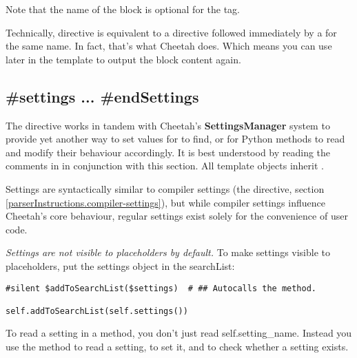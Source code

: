 Note that the name of the block is optional for the  tag.

Technically,  directive is equivalent to a  directive
followed immediately by a  for the same name.  In fact,
that's what Cheetah does.  Which means you can use 
later in the template to output the block content again.



\subsection{\#settings ... \#endSettings}
\label{inheritanceEtc.settings}

The  directive works in tandem with Cheetah's
{\bf SettingsManager} system to provide yet another way to set values for
 to find, or for Python methods to read and modify their
behaviour accordingly.  It is best understood by reading the comments in
 in conjunction with this section.  All 
template objects inherit .

Settings are syntactically similar to compiler settings (the
 directive, section
\ref{parserInstructions.compiler-settings}), but while compiler settings
influence Cheetah's core behaviour, regular settings exist solely for the
convenience of user code.

{\em Settings are not visible to placeholders by default.}  To make settings
visible to placeholders, put the settings object in the searchList:  

\begin{verbatim}
#silent $addToSearchList($settings)  # ## Autocalls the method.

self.addToSearchList(self.settings())
\end{verbatim}


To read a setting in a method, you don't just read self.setting\_name.  Instead
you use the  method to read a setting,
 to set it, and  to
check whether a setting exists.  

